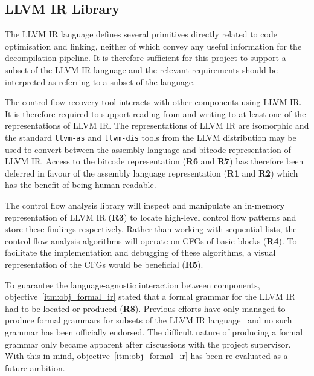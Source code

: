
\subsection{LLVM IR Library}
\label{sec:req_llvm_ir_library}

The LLVM IR language defines several primitives directly related to code optimisation and linking, neither of which convey any useful information for the decompilation pipeline. It is therefore sufficient for this project to support a subset of the LLVM IR language and the relevant requirements should be interpreted as referring to a subset of the language.

The control flow recovery tool interacts with other components using LLVM IR. It is therefore required to support reading from and writing to at least one of the representations of LLVM IR. The representations of LLVM IR are isomorphic and the standard \texttt{llvm-as} and \texttt{llvm-dis} tools from the LLVM distribution may be used to convert between the assembly language and bitcode representation of LLVM IR. Access to the bitcode representation (\textbf{R6} and \textbf{R7}) has therefore been deferred in favour of the assembly language representation (\textbf{R1} and \textbf{R2}) which has the benefit of being human-readable.

The control flow analysis library will inspect and manipulate an in-memory representation of LLVM IR (\textbf{R3}) to locate high-level control flow patterns and store these findings respectively. Rather than working with sequential lists, the control flow analysis algorithms will operate on CFGs of basic blocks (\textbf{R4}). To facilitate the implementation and debugging of these algorithms, a visual representation of the CFGs would be beneficial (\textbf{R5}).

To guarantee the language-agnostic interaction between components, objective~\ref{itm:obj_formal_ir} stated that a formal grammar for the LLVM IR had to be located or produced (\textbf{R8}). Previous efforts have only managed to produce formal grammars for subsets of the LLVM IR language~\cite{formal_llvm_ir_spec,formalizing_llvm_ir} and no such grammar has been officially endorsed. The difficult nature of producing a formal grammar only became apparent after discussions with the project supervisor. With this in mind, objective~\ref{itm:obj_formal_ir} has been re-evaluated as a future ambition.

